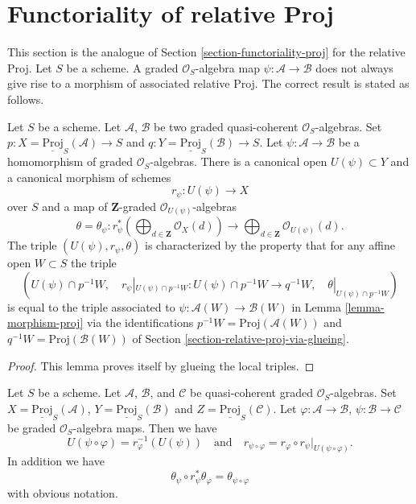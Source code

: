 \section{Functoriality of relative Proj}
\label{section-functoriality-relative-proj}

\noindent
This section is the analogue of Section \ref{section-functoriality-proj}
for the relative Proj. Let $S$ be a scheme. A graded $\mathcal{O}_S$-algebra
map $\psi : \mathcal{A} \to \mathcal{B}$ does not always give rise to a
morphism of associated relative Proj. The correct result is stated as follows.

\begin{lemma}
\label{lemma-morphism-relative-proj}
Let $S$ be a scheme. Let $\mathcal{A}$, $\mathcal{B}$ be two graded
quasi-coherent $\mathcal{O}_S$-algebras. Set
$p : X = \underline{\text{Proj}}_S(\mathcal{A}) \to S$ and
$q : Y = \underline{\text{Proj}}_S(\mathcal{B}) \to S$. Let
$\psi : \mathcal{A} \to \mathcal{B}$ be a homomorphism of
graded $\mathcal{O}_S$-algebras. There is a canonical open
$U(\psi) \subset Y$ and a canonical morphism of schemes
$$
r_\psi :
U(\psi)
\longrightarrow
X
$$
over $S$ and a map of $\mathbf{Z}$-graded $\mathcal{O}_{U(\psi)}$-algebras
$$
\theta = \theta_\psi :
r_\psi^*\left(
\bigoplus\nolimits_{d \in \mathbf{Z}} \mathcal{O}_X(d)
\right)
\longrightarrow
\bigoplus\nolimits_{d \in \mathbf{Z}} \mathcal{O}_{U(\psi)}(d).
$$
The triple $(U(\psi), r_\psi, \theta)$ is characterized by the property
that for any affine open $W \subset S$ the triple
$$
(U(\psi) \cap p^{-1}W,\quad
r_\psi|_{U(\psi) \cap p^{-1}W} : U(\psi) \cap p^{-1}W \to q^{-1}W,\quad
\theta|_{U(\psi) \cap p^{-1}W})
$$
is equal to the triple associated to
$\psi : \mathcal{A}(W) \to \mathcal{B}(W)$ in
Lemma \ref{lemma-morphism-proj} via the identifications
$p^{-1}W = \text{Proj}(\mathcal{A}(W))$ and
$q^{-1}W = \text{Proj}(\mathcal{B}(W))$ of
Section \ref{section-relative-proj-via-glueing}.
\end{lemma}

\begin{proof}
This lemma proves itself by glueing the local triples.
\end{proof}

\begin{lemma}
\label{lemma-morphism-relative-proj-transitive}
Let $S$ be a scheme. Let $\mathcal{A}$, $\mathcal{B}$, and $\mathcal{C}$ be
quasi-coherent graded $\mathcal{O}_S$-algebras.
Set $X = \underline{\text{Proj}}_S(\mathcal{A})$,
$Y = \underline{\text{Proj}}_S(\mathcal{B})$ and
$Z = \underline{\text{Proj}}_S(\mathcal{C})$.
Let $\varphi : \mathcal{A} \to \mathcal{B}$,
$\psi : \mathcal{B} \to \mathcal{C}$ be graded $\mathcal{O}_S$-algebra maps.
Then we have
$$
U(\psi \circ \varphi) = r_\varphi^{-1}(U(\psi))
\quad
\text{and}
\quad
r_{\psi \circ \varphi}
=
r_\varphi \circ r_\psi|_{U(\psi \circ \varphi)}.
$$
In addition we have
$$
\theta_\psi \circ r_\psi^*\theta_\varphi
=
\theta_{\psi \circ \varphi}
$$
with obvious notation.
\end{lemma}

